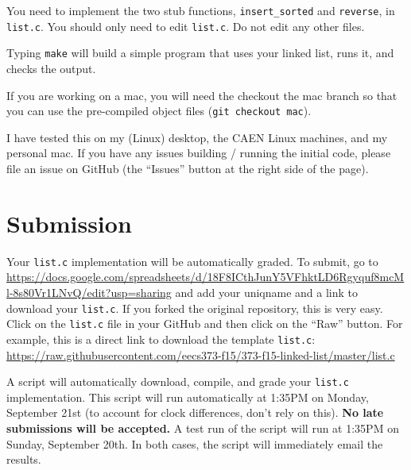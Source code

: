 \documentclass{article}
\begin{document}
\medskip
\noindent
You need to implement the two stub functions, \texttt{insert\_sorted} and
\texttt{reverse}, in \texttt{list.c}. You should only need to edit
\texttt{list.c}. Do not edit any other files.

\medskip
\noindent
Typing \texttt{make} will build a simple program that uses your linked list,
runs it, and checks the output.

\medskip
\noindent
If you are working on a mac, you will need the checkout the mac branch so that
you can use the pre-compiled object files (\texttt{git checkout mac}).

\medskip
\noindent
I have tested this on my (Linux) desktop, the CAEN Linux machines, and my
personal mac. If you have any issues building / running the initial code,
please file an issue on GitHub (the ``Issues'' button at the right side of the
page).


\section*{Submission}

Your \texttt{list.c} implementation will be automatically graded. To submit,
go to \url{https://docs.google.com/spreadsheets/d/18F8ICthJunY5VFhktLD6Rgyquf8mcMl-8s80Vr1LNvQ/edit?usp=sharing}
and add your uniqname and a link to download your \texttt{list.c}. If you
forked the original repository, this is very easy. Click on the
\texttt{list.c} file in your GitHub and then click on the ``Raw'' button. For
example, this is a direct link to download the template \texttt{list.c}:
\url{https://raw.githubusercontent.com/eecs373-f15/373-f15-linked-list/master/list.c}

\medskip
\noindent
A script will automatically download, compile, and grade your \texttt{list.c}
implementation. This script will run automatically at 1:35PM on Monday,
September 21st (to account for clock differences, don't rely on this).
\textbf{\color{red}No late submissions will be accepted.}
A test run of the script will run at 1:35PM on Sunday, September 20th. In both
cases, the script will immediately email the results.
\end{document}
